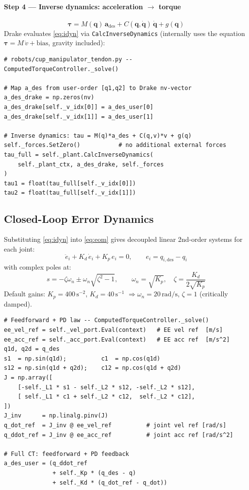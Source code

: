 \documentclass[11pt, a4paper]{article}
\begin{document}
\paragraph{Step 4 — Inverse dynamics: acceleration $\to$ torque}
\begin{equation}
  \bm{\tau} = M(\bm{q})\,\bm{a}_\text{des} + C(\bm{q},\dot{\bm{q}})\,\dot{\bm{q}} + g(\bm{q})
  \label{eq:idyn}
\end{equation}
Drake evaluates \eqref{eq:idyn} via \texttt{CalcInverseDynamics} (internally
uses the equation $\bm{\tau} = M\,\dot{v} + \text{bias}$, gravity included):

\begin{lstlisting}
# robots/cup_manipulator_tendon.py -- ComputedTorqueController._solve()

# Map a_des from user-order [q1,q2] to Drake nv-vector
a_des_drake = np.zeros(nv)
a_des_drake[self._v_idx[0]] = a_des_user[0]
a_des_drake[self._v_idx[1]] = a_des_user[1]

# Inverse dynamics: tau = M(q)*a_des + C(q,v)*v + g(q)
self._forces.SetZero()           # no additional external forces
tau_full = self._plant.CalcInverseDynamics(
    self._plant_ctx, a_des_drake, self._forces
)
tau1 = float(tau_full[self._v_idx[0]])
tau2 = float(tau_full[self._v_idx[1]])
\end{lstlisting}

\subsection{Closed-Loop Error Dynamics}

Substituting \eqref{eq:idyn} into \eqref{eq:eom} gives decoupled linear
2nd-order systems for each joint:
\begin{equation}
  \ddot{e}_i + K_d\,\dot{e}_i + K_p\,e_i = 0, \qquad
  e_i = q_{i,\text{des}} - q_i
  \label{eq:closed-loop}
\end{equation}
with complex poles at:
\begin{equation}
  s = -\zeta\omega_n \pm \omega_n\sqrt{\zeta^2 - 1}, \qquad
  \omega_n = \sqrt{K_p}, \quad
  \zeta = \frac{K_d}{2\sqrt{K_p}}
  \label{eq:poles}
\end{equation}
Default gains: $K_p = 400\,\text{s}^{-2}$, $K_d = 40\,\text{s}^{-1}$
$\Rightarrow \omega_n = 20\,\text{rad/s}$, $\zeta = 1$ (critically damped).

\begin{lstlisting}
# Feedforward + PD law -- ComputedTorqueController._solve()
ee_vel_ref = self._vel_port.Eval(context)   # EE vel ref  [m/s]
ee_acc_ref = self._acc_port.Eval(context)   # EE acc ref  [m/s^2]
q1d, q2d = q_des
s1  = np.sin(q1d);          c1  = np.cos(q1d)
s12 = np.sin(q1d + q2d);    c12 = np.cos(q1d + q2d)
J = np.array([
    [-self._L1 * s1 - self._L2 * s12, -self._L2 * s12],
    [ self._L1 * c1 + self._L2 * c12,  self._L2 * c12],
])
J_inv      = np.linalg.pinv(J)
q_dot_ref  = J_inv @ ee_vel_ref          # joint vel ref [rad/s]
q_ddot_ref = J_inv @ ee_acc_ref          # joint acc ref [rad/s^2]

# Full CT: feedforward + PD feedback
a_des_user = (q_ddot_ref
              + self._Kp * (q_des - q)
              + self._Kd * (q_dot_ref - q_dot))
\end{lstlisting}
\end{document}
